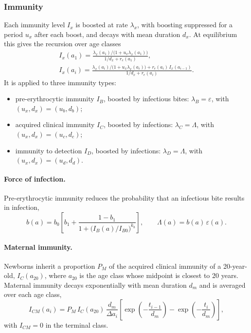 \subsubsection{Immunity}

Each immunity level $I_x$ is boosted at rate $\lambda_x$, with boosting suppressed for a period $u_x$ after each boost, and decays with mean duration $d_x$. At equilibrium this gives the recursion over age classes
\begin{gather*}
I_x(a_1) = \frac{\lambda_x(a_1)/\big(1 + u_x \lambda_x(a_1)\big)}{1/d_x + r_e(a_1)}, \\
I_x(a_i) = \frac{\lambda_x(a_i)/\big(1 + u_x \lambda_x(a_i)\big) + r_e(a_i)\, I_x(a_{i-1})}{1/d_x + r_e(a_i)}.
\end{gather*}
It is applied to three immunity types:
\begin{itemize}
  \item pre-erythrocytic immunity $I_B$, boosted by infectious bites: $\lambda_B = \varepsilon$, with $(u_x, d_x) = (u_b, d_b)$;
  \item acquired clinical immunity $I_C$, boosted by infections: $\lambda_C = \Lambda$, with $(u_x, d_x) = (u_c, d_c)$;
  \item immunity to detection $I_D$, boosted by infections: $\lambda_D = \Lambda$, with $(u_x, d_x) = (u_d, d_d)$.
\end{itemize}

\paragraph{Force of infection.} Pre-erythrocytic immunity reduces the probability that an infectious bite results in infection,
\begin{equation*}
b(a) = b_0\left[b_1 + \frac{1 - b_1}{1 + \big(I_B(a)/I_{B0}\big)^{k_b}}\right],
\qquad
\Lambda(a) = b(a)\,\varepsilon(a).
\end{equation*}

\paragraph{Maternal immunity.} Newborns inherit a proportion $P_M$ of the acquired clinical immunity of a 20-year-old, $I_C(a_{20})$, where $a_{20}$ is the age class whose midpoint is closest to 20 years. Maternal immunity decays exponentially with mean duration $d_m$ and is averaged over each age class,
\begin{equation*}
I_{CM}(a_i) = P_M\, I_C(a_{20})\, \frac{d_m}{\Delta a_i}\left[\exp\!\left(-\frac{t_{i-1}}{d_m}\right) - \exp\!\left(-\frac{t_i}{d_m}\right)\right],
\end{equation*}
with $I_{CM} = 0$ in the terminal class.


